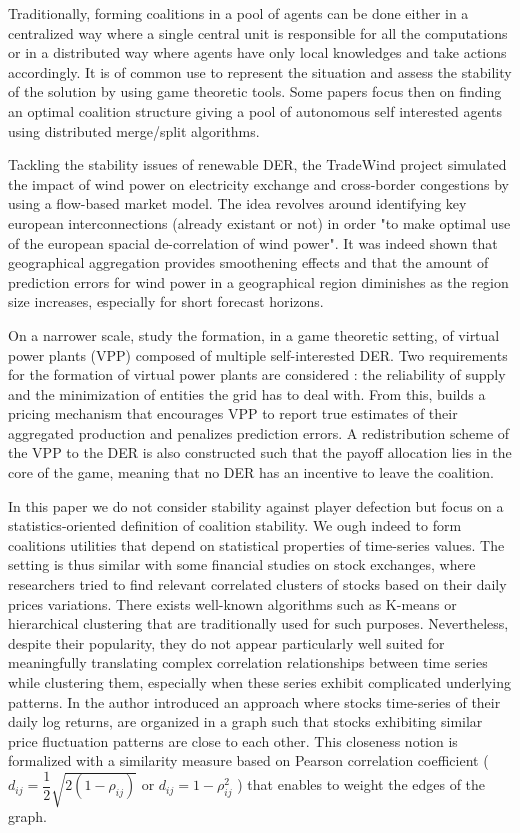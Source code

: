 \documentclass[conference]{IEEEtran}
\begin{document}
Traditionally, forming coalitions in a pool of agents can be done either in a centralized way where a single central unit is responsible for all the computations or in a distributed way where agents have only local knowledges and take actions accordingly. It is of common use to represent the situation and assess the stability of the solution by using game theoretic tools. Some papers \cite{Saad2009} \cite{Luan2014} focus then on finding an optimal coalition structure giving a pool of autonomous self interested agents using distributed merge/split algorithms.

Tackling the stability issues of renewable DER, the TradeWind project \cite{Europe} simulated the impact of wind power on electricity exchange and cross-border congestions by using a flow-based market model. The idea revolves around identifying key european interconnections (already existant or not) in order "to make optimal use of the european spacial de-correlation of wind power". It was indeed shown that geographical aggregation provides smoothening effects and that the amount of prediction errors for wind power in a geographical region diminishes as the region size increases, especially for short forecast horizons.

On a narrower scale, \cite{Kota2011} study the formation, in a game theoretic setting, of virtual power plants (VPP) composed of multiple self-interested DER. Two requirements for the formation of virtual power plants are considered : the reliability of supply and the minimization of entities the grid has to deal with. From this, \cite{Kota2011} builds a pricing mechanism that encourages VPP to report true estimates of their aggregated production and penalizes prediction errors. A redistribution scheme of the VPP to the DER is also constructed such that the payoff allocation lies in the core of the game, meaning that no DER has an incentive to leave the coalition.

In this paper we do not consider stability against player defection but focus on a statistics-oriented definition of coalition stability. We ough indeed to form coalitions utilities that depend on statistical properties of time-series values. The setting is thus similar with some financial studies on stock exchanges, where researchers tried to find relevant correlated clusters of stocks based on their daily prices variations. There exists well-known algorithms such as K-means or hierarchical clustering that are traditionally used for such purposes. Nevertheless, despite their popularity, they do not appear particularly well suited for meaningfully translating complex correlation relationships between time series while clustering them, especially when these series exhibit complicated underlying patterns. In \cite{Mantegna1999} the author introduced an approach where stocks time-series of their daily log returns, are organized in a graph such that stocks exhibiting similar price fluctuation patterns are close to each other. This closeness notion is formalized with a similarity measure based on Pearson correlation coefficient ($ d_{ij} = \dfrac{1}{2}\sqrt{2(1-\rho_{ij})} $ or $ d_{ij} = 1 - \rho_{ij}^{2} $ ) that enables to weight the edges of the graph. 
\end{document}
